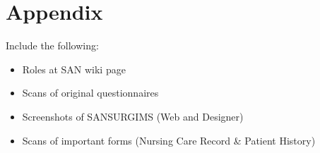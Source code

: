 \section{Appendix}

Include the following:
\begin{itemize}
\item Roles at SAN wiki page
\item Scans of original questionnaires
\item Screenshots of SANSURGIMS (Web and Designer)
\item Scans of important forms (Nursing Care Record \& Patient History)
\end{itemize}